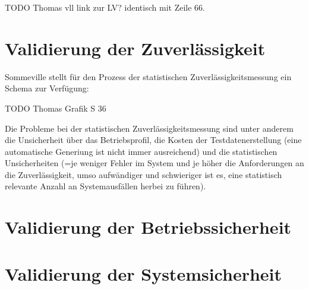 TODO Thomas vll link zur LV? identisch mit Zeile 66.

\section{Validierung der Zuverlässigkeit}
Sommeville stellt für den Prozess der statistischen Zuverlässigkeitsmessung ein Schema zur Verfügung:

TODO Thomas Grafik S 36

Die Probleme bei der statistischen Zuverlässigkeitsmessung sind unter anderem die Unsicherheit über das Betriebsprofil, die Kosten der Testdatenerstellung (eine automatische Generiung ist nicht immer ausreichend) und die statistischen Unsicherheiten (=je weniger Fehler im System und je höher die Anforderungen an die Zuverlässigkeit, umso aufwändiger und schwieriger ist es, eine statistisch relevante Anzahl an Systemausfällen herbei zu führen).

\section{Validierung der Betriebssicherheit}

\section{Validierung der Systemsicherheit}